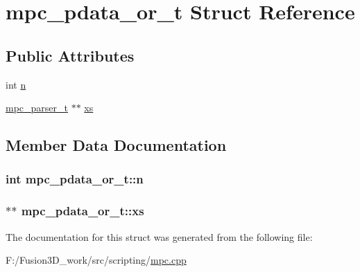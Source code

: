 \hypertarget{structmpc__pdata__or__t}{}\section{mpc\+\_\+pdata\+\_\+or\+\_\+t Struct Reference}
\label{structmpc__pdata__or__t}
\subsection*{Public Attributes}
\begin{DoxyCompactItemize}
\item 
int \hyperlink{structmpc__pdata__or__t_a083298bc4f946c29d13e61f4c77cfa31}{n}
\item 
\hyperlink{structmpc__parser__t}{mpc\+\_\+parser\+\_\+t} $\ast$$\ast$ \hyperlink{structmpc__pdata__or__t_abcf335437198d8eafe72da81b4316d98}{xs}
\end{DoxyCompactItemize}


\subsection{Member Data Documentation}
\hypertarget{structmpc__pdata__or__t_a083298bc4f946c29d13e61f4c77cfa31}{}
\subsubsection[{n}]{\setlength{\rightskip}{0pt plus 5cm}int mpc\+\_\+pdata\+\_\+or\+\_\+t\+::n}\label{structmpc__pdata__or__t_a083298bc4f946c29d13e61f4c77cfa31}
\hypertarget{structmpc__pdata__or__t_abcf335437198d8eafe72da81b4316d98}{}
\subsubsection[{xs}]{$\ast$$\ast$ mpc\+\_\+pdata\+\_\+or\+\_\+t\+::xs}\label{structmpc__pdata__or__t_abcf335437198d8eafe72da81b4316d98}


The documentation for this struct was generated from the following file\+:\begin{DoxyCompactItemize}
\item 
F\+:/\+Fusion3\+D\+\_\+work/src/scripting/\hyperlink{mpc_8cpp}{mpc.\+cpp}\end{DoxyCompactItemize}
